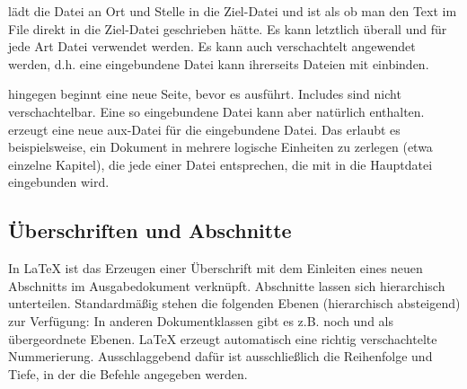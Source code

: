  lädt die Datei an Ort und Stelle in die Ziel-Datei und ist als ob man den Text im File direkt in die Ziel-Datei geschrieben hätte. Es kann letztlich überall und für jede Art Datei verwendet werden. Es kann auch verschachtelt angewendet werden, d.h. eine eingebundene Datei kann ihrerseits Dateien mit  einbinden.\vspace{6pt}

 hingegen beginnt eine neue Seite, bevor es  ausführt. Includes sind nicht verschachtelbar. Eine so eingebundene Datei kann aber natürlich  enthalten.  erzeugt eine neue aux-Datei für die eingebundene Datei. Das erlaubt es beispielsweise, ein Dokument in mehrere logische Einheiten zu zerlegen (etwa einzelne Kapitel), die jede einer Datei entsprechen, die mit  in die Hauptdatei eingebunden wird.\\

\subsection{Überschriften und Abschnitte}
In \LaTeX{} ist das Erzeugen einer Überschrift mit dem Einleiten eines neuen Abschnitts im Ausgabedokument verknüpft. Abschnitte lassen sich hierarchisch unterteilen. Standardmäßig stehen die folgenden Ebenen (hierarchisch absteigend) zur Verfügung:
\setcounter{section}{0}
\setcounter{section}{3}
\setcounter{subsection}{3}
In anderen Dokumentklassen gibt es z.B. noch  und  als übergeordnete Ebenen. \LaTeX{} erzeugt automatisch eine richtig verschachtelte Nummerierung. Ausschlaggebend dafür ist ausschließlich die Reihenfolge und Tiefe, in der die Befehle angegeben werden.\\

